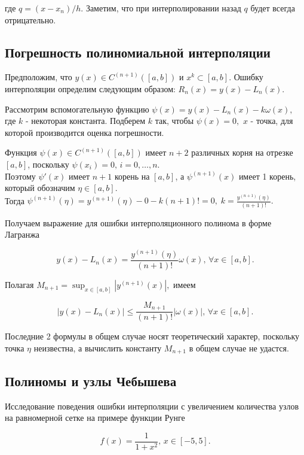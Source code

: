 где \( q = (x - x_n)/h \). Заметим, что при интерполировании назад \( q \) будет всегда отрицательно.

\subsection{Погрешность полиномиальной интерполяции}

Предположим, что $ y(x) \in C^{(n+1)}([a,b]) $ и $ x^k \subset [a,b]. $  Ошибку интерполяции определим следующим образом: $R_n(x) = y(x) - L_n(x).$  

Рассмотрим вспомогательную функцию $\psi(x) = y(x) - L_n(x) - k\omega(x),$ где \( k \) - некоторая константа. Подберем $ k $ так, чтобы  
$\psi(x) = 0,$  $ x $ - точка, для которой производится оценка погрешности.  

Функция  
$\psi(x) \in C^{(n+1)}([a,b])$ имеет \( n + 2 \) различных корня на отрезке \([a,b]\), поскольку $\psi(x_i) = 0, \, i = 0, \ldots, n.$\\
  
Поэтому $\psi'(x)$ имеет \( n + 1 \) корень на \([a,b]\), а $\psi^{(n+1)}(x)$  
имеет 1 корень, который обозначим $\eta \in [a,b].$\\
  
Тогда $\psi^{(n+1)}(\eta) = y^{(n+1)}(\eta) - 0 - k(n + 1)! = 0, \; k = \frac{y^{(n+1)}(\eta)}{(n + 1)!}.$  

Получаем выражение для ошибки интерполяционного полинома в форме Лагранжа  

$$y(x) - L_n(x) = \frac{y^{(n+1)}(\eta)}{(n + 1)!} \omega(x), \, \forall x \in [a,b].$$  

Полагая $M_{n+1} = \sup_{x \in [a,b]} |y^{(n+1)}(x)|,$ имеем  

$$|y(x) - L_n(x)| \leq \frac{M_{n+1}}{(n + 1)!} |\omega(x)|, \, \forall x \in [a,b].$$  

Последние 2 формулы в общем случае носят теоретический характер, поскольку точка \( \eta \) неизвестна, а вычислить константу \( M_{n+1} \) в общем случае не удастся.

\subsection{Полиномы и узлы Чебышева}

Исследование поведения ошибки интерполяции с увеличением количества узлов на равномерной сетке на примере функции Рунге

$$f(x) = \frac{1}{1 + x^2}, \, x \in [-5, 5].$$

